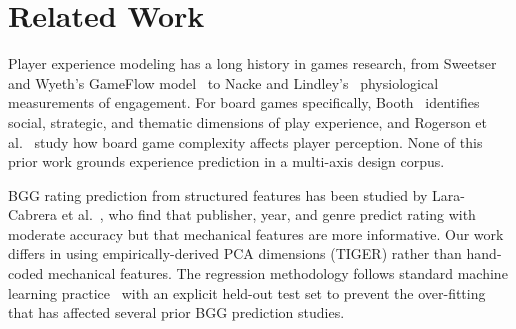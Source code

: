 \section{Related Work}
\label{sec:related}

Player experience modeling has a long history in games research, from Sweetser and
Wyeth's GameFlow model~\cite{sweetser2005gameflow} to Nacke and Lindley's~\cite{nacke2008flow}
physiological measurements of engagement. For board games specifically, Booth~\cite{booth2021game}
identifies social, strategic, and thematic dimensions of play experience, and Rogerson
et al.~\cite{rogerson2016its} study how board game complexity affects player perception.
None of this prior work grounds experience prediction in a multi-axis design corpus.

BGG rating prediction from structured features has been studied by Lara-Cabrera et
al.~\cite{laracabrera2014analysis}, who find that publisher, year, and genre predict
rating with moderate accuracy but that mechanical features are more informative. Our
work differs in using empirically-derived PCA dimensions (TIGER) rather than hand-coded
mechanical features. The regression methodology follows standard machine learning
practice~\cite{bishop2006pattern} with an explicit held-out test set to prevent the
over-fitting that has affected several prior BGG prediction studies.
